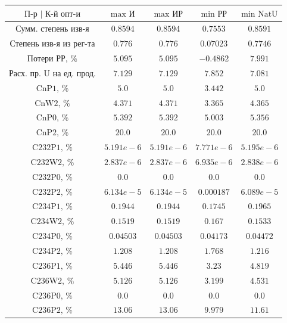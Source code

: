 \begin{table}
    \begin{tabular}{ccccc}
        $\text{П-р | К-й опт-и}$ & $\text{max И}$ & $\text{max ИР}$ & $\text{min РР}$ & $\text{min NatU}$\\ \hline
        $\text{Сумм. степень изв-я}$ & $0.8594$ & $0.8594$ & $0.7553$ & $0.8591$\\ \hline
        $\text{Степень изв-я из рег-та}$ & $0.776$ & $0.776$ & $0.07023$ & $0.7746$\\ \hline
        $\text{Потери РР, \%}$ & $5.095$ & $5.095$ & $-0.4862$ & $7.991$\\ \hline
        $\text{Расх. пр. U на ед. прод.}$ & $7.129$ & $7.129$ & $7.852$ & $7.081$\\ \hline
        $\text{CnP1, \%}$ & $5.0$ & $5.0$ & $3.442$ & $5.0$\\ \hline
        $\text{CnW2, \%}$ & $4.371$ & $4.371$ & $3.365$ & $4.365$\\ \hline
        $\text{CnP0, \%}$ & $5.392$ & $5.392$ & $5.003$ & $5.356$\\ \hline
        $\text{CnP2, \%}$ & $20.0$ & $20.0$ & $20.0$ & $20.0$\\ \hline
        $\text{C232P1, \%}$ & $5.191e-6$ & $5.191e-6$ & $7.771e-6$ & $5.195e-6$\\ \hline
        $\text{C232W2, \%}$ & $2.837e-6$ & $2.837e-6$ & $6.935e-6$ & $2.838e-6$\\ \hline
        $\text{C232P0, \%}$ & $0.0$ & $0.0$ & $0.0$ & $0.0$\\ \hline
        $\text{C232P2, \%}$ & $6.134e-5$ & $6.134e-5$ & $0.000187$ & $6.089e-5$\\ \hline
        $\text{C234P1, \%}$ & $0.1944$ & $0.1944$ & $0.1745$ & $0.1965$\\ \hline
        $\text{C234W2, \%}$ & $0.1519$ & $0.1519$ & $0.167$ & $0.1533$\\ \hline
        $\text{C234P0, \%}$ & $0.04503$ & $0.04503$ & $0.04173$ & $0.04472$\\ \hline
        $\text{C234P2, \%}$ & $1.208$ & $1.208$ & $1.768$ & $1.216$\\ \hline
        $\text{C236P1, \%}$ & $5.446$ & $5.446$ & $3.23$ & $4.819$\\ \hline
        $\text{C236W2, \%}$ & $5.126$ & $5.126$ & $3.199$ & $4.531$\\ \hline
        $\text{C236P0, \%}$ & $0.0$ & $0.0$ & $0.0$ & $0.0$\\ \hline
        $\text{C236P2, \%}$ & $13.06$ & $13.06$ & $9.979$ & $11.61$\\ \hline

\end{tabular}
\end{table}
